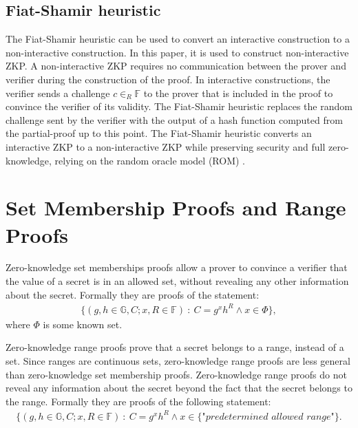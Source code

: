 \subsection*{Fiat-Shamir heuristic}
The Fiat-Shamir heuristic \cite{Fiat-Shamir} can be used to convert an interactive construction to a non-interactive construction. In this paper, it is used to construct non-interactive ZKP. A non-interactive  ZKP requires no communication between the prover and verifier during the construction of the proof. In interactive constructions, the verifier sends a challenge $c\in_R\mathds{F}$ to the prover that is included in the proof to convince the verifier of its validity. The Fiat-Shamir heuristic replaces the random challenge sent by the verifier with the output of a hash function computed from the partial-proof up to this point. The Fiat-Shamir heuristic converts an interactive ZKP to a non-interactive  ZKP while preserving security and full zero-knowledge, relying on the random oracle model (ROM) \cite{Fiat-Shamir} .




\section{Set Membership Proofs and Range Proofs}
\label{sec:RF_theory}
Zero-knowledge set memberships proofs allow a prover to convince a verifier that the value of a secret is in an allowed set, without revealing any other information about the secret. Formally they are proofs of the statement:
\begin{align} \label{eq:SM_statement}
    \{(g,h\in\mathds{G},C;x,R\in\mathds{F})\::\:C= g^x h^R \wedge x \in \Phi\},
\end{align}
where $\Phi$ is some known set. 
 
Zero-knowledge range proofs prove that a secret belongs to a range, instead of a set. Since ranges are continuous sets, zero-knowledge range proofs are less general than zero-knowledge set membership proofs.  Zero-knowledge range proofs do not reveal any information about the secret beyond the fact that the secret belongs to the range. Formally they are proofs of the following statement: 
\begin{align} \label{eq:RP_statement}
    \{(g,h\in\mathds{G},C;x,R\in\mathds{F})\::\:C= g^x h^R \wedge x \in \{\textit{"predetermined allowed range"}\}.
\end{align}


